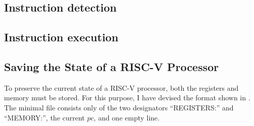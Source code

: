 

\subsection{Instruction detection}
\subsection{Instruction execution}

\subsection{Saving the State of a RISC-V
      Processor}\label{sub:statefile}

To preserve the current state of a RISC-V processor, both the
registers and memory must be stored. For this purpose, I have devised
the format shown in . The minimal file consists
only of the two designators \enquote{REGISTERS:} and
\enquote{MEMORY:}, the current $pc$, and one empty line.

